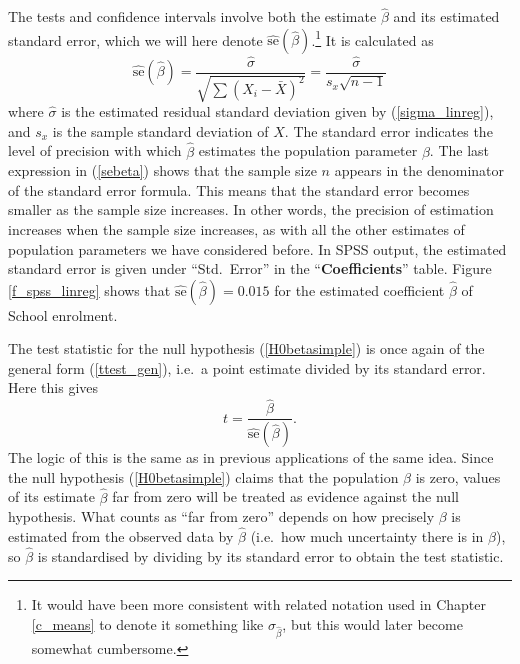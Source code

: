 The tests and confidence intervals involve both the estimate
$\hat{\beta}$ and its estimated
standard error, which we will here
denote $\hat{\text{se}}(\hat{\beta})$.\footnote{It would have been more
consistent with related notation used in Chapter \ref{c_means} to
denote it something like $\hat{\sigma}_{\hat{\beta}}$, but this would
later become somewhat cumbersome.}  It is calculated as
\begin{equation}
\hat{\text{se}}(\hat{\beta})=
\frac{\hat{\sigma}}{\sqrt{\sum\left(X_{i}-\bar{X}\right)^{2}}}
=\frac{\hat{\sigma}}{s_{x}\sqrt{n-1}}
\label{sebeta}
\end{equation}
where $\hat{\sigma}$ is the estimated residual standard deviation given
by (\ref{sigma_linreg}), and $s_{x}$ is the sample standard deviation of
$X$. The standard error indicates the level of precision with which
$\hat{\beta}$ estimates the population parameter $\beta$. The last
expression in (\ref{sebeta}) shows that the sample size $n$ appears in
the denominator of the standard error formula. This means that the
standard error becomes smaller as the sample size increases. In other
words, the precision of estimation increases when the sample size
increases, as with all the other estimates of population parameters we
have considered before. In SPSS output, the estimated standard error is
given under ``Std.\ Error'' in the ``\textbf{Coefficients}'' table. Figure
\ref{f_spss_linreg} shows that $\hat{\text{se}}(\hat{\beta})=0.015$ for
the estimated coefficient $\hat{\beta}$ of School enrolment.

The test statistic for the null hypothesis (\ref{H0betasimple}) is once
again of the general form (\ref{ttest_gen}), i.e.\ a point estimate
divided by its standard error. Here this gives
\begin{equation}
t=\frac{\hat{\beta}}{\hat{\text{se}}(\hat{\beta})}.
\label{tbeta}
\end{equation}
The logic of this is the same as in previous applications of the same
idea. Since the null hypothesis (\ref{H0betasimple}) claims that the
population $\beta$ is zero, values of its estimate $\hat{\beta}$ far from
zero will be treated as evidence against the null hypothesis. What
counts as ``far from zero'' depends on how precisely $\beta$ is
estimated from the observed data by $\hat{\beta}$ (i.e.\ how much
uncertainty there is in $\hat{\beta}$), so $\hat{\beta}$ is
standardised by dividing by its standard error to obtain the test
statistic.

